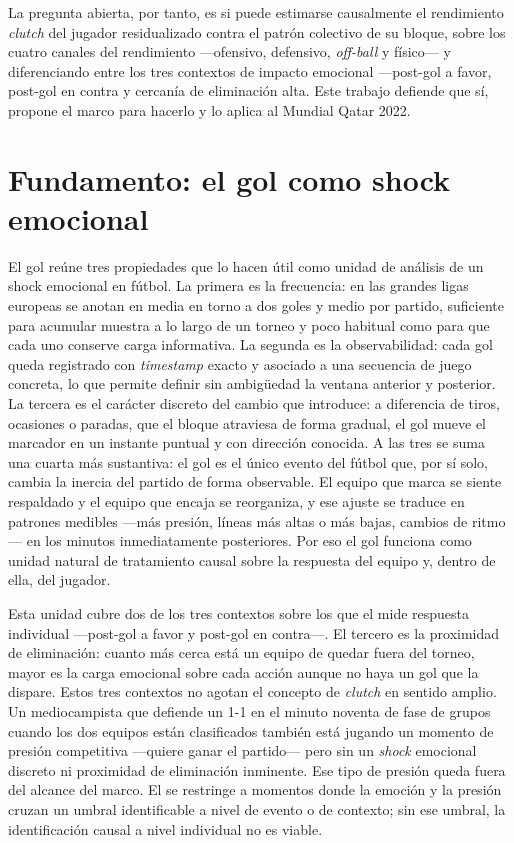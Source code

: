 La pregunta abierta, por tanto, es si puede estimarse causalmente el
rendimiento \textit{clutch} del jugador residualizado contra el patrón
colectivo de su bloque, sobre los cuatro canales del rendimiento
---ofensivo, defensivo, \emph{off-ball} y físico--- y diferenciando
entre los tres contextos de impacto emocional ---post-gol a favor,
post-gol en contra y cercanía de eliminación alta. Este trabajo
defiende que sí, propone el marco para hacerlo y lo aplica al Mundial
Qatar 2022.


\section{Fundamento: el gol como shock emocional}
\label{sec:fundamento-gol}

El gol reúne tres propiedades que lo hacen útil como unidad de análisis
de un shock emocional en fútbol. La primera es la frecuencia: en las
grandes ligas europeas se anotan en media en torno a dos goles y medio
por partido, suficiente para acumular muestra a lo largo de un torneo
y poco habitual como para que cada uno conserve carga informativa. La
segunda es la observabilidad: cada gol queda registrado con
\textit{timestamp} exacto y asociado a una secuencia de juego concreta,
lo que permite definir sin ambigüedad la ventana anterior y posterior.
La tercera es el carácter discreto del cambio que introduce: a diferencia
de tiros, ocasiones o paradas, que el bloque atraviesa de forma gradual,
el gol mueve el marcador en un instante puntual y con dirección conocida.
A las tres se suma una cuarta más sustantiva: el gol es el único
evento del fútbol que, por sí solo, cambia la inercia del partido de
forma observable. El equipo que marca se siente respaldado y el equipo
que encaja se reorganiza, y ese ajuste se traduce en patrones medibles
---más presión, líneas más altas o más bajas, cambios de ritmo--- en
los minutos inmediatamente posteriores. Por eso el gol funciona como
unidad natural de tratamiento causal sobre la respuesta del equipo y,
dentro de ella, del jugador.

Esta unidad cubre dos de los tres contextos sobre los que el \CCV mide
respuesta individual ---post-gol a favor y post-gol en contra---. El
tercero es la proximidad de eliminación: cuanto más cerca está un
equipo de quedar fuera del torneo, mayor es la carga emocional sobre
cada acción aunque no haya un gol que la dispare. Estos tres contextos
no agotan el concepto de \textit{clutch} en sentido amplio. Un
mediocampista que defiende un 1-1 en el minuto noventa de fase de
grupos cuando los dos equipos están clasificados también está jugando
un momento de presión competitiva ---quiere ganar el partido--- pero
sin un \textit{shock} emocional discreto ni proximidad de eliminación
inminente. Ese tipo de presión queda fuera del alcance del marco. El
\CCV se restringe a momentos donde la emoción y la presión cruzan un
umbral identificable a nivel de evento o de contexto; sin ese umbral,
la identificación causal a nivel individual no es viable.

